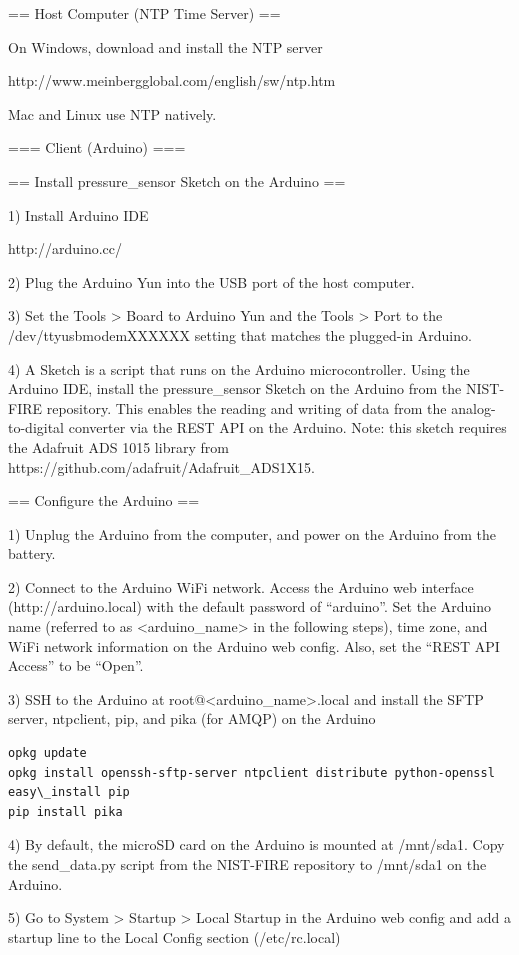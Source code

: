 \documentclass[11pt,oneside]{book}
\begin{document}
== Host Computer (NTP Time Server) ==

On Windows, download and install the NTP server

http://www.meinbergglobal.com/english/sw/ntp.htm

Mac and Linux use NTP natively.


=== Client (Arduino) ===

== Install pressure\_sensor Sketch on the Arduino ==

1) Install Arduino IDE

http://arduino.cc/

2) Plug the Arduino Yun into the USB port of the host computer.

3) Set the Tools > Board to Arduino Yun and the Tools > Port to the /dev/ttyusbmodemXXXXXX setting that matches the plugged-in Arduino.

4) A Sketch is a script that runs on the Arduino microcontroller. Using the Arduino IDE, install the pressure\_sensor Sketch on the Arduino from the NIST-FIRE repository. This enables the reading and writing of data from the analog-to-digital converter via the REST API on the Arduino. Note: this sketch requires the Adafruit ADS 1015 library from https://github.com/adafruit/Adafruit\_ADS1X15.

== Configure the Arduino ==

1) Unplug the Arduino from the computer, and power on the Arduino from the battery.

2) Connect to the Arduino WiFi network. Access the Arduino web interface (http://arduino.local) with the default password of “arduino”. Set the Arduino name (referred to as <arduino\_name> in the following steps), time zone, and WiFi network information on the Arduino web config. Also, set the “REST API Access” to be “Open”.

3) SSH to the Arduino at root@<arduino\_name>.local and install the SFTP server, ntpclient, pip, and pika (for AMQP) on the Arduino

\begin{verbatim}
opkg update
opkg install openssh-sftp-server ntpclient distribute python-openssl
easy\_install pip
pip install pika
\end{verbatim}

4) By default, the microSD card on the Arduino is mounted at /mnt/sda1. Copy the send\_data.py script from the NIST-FIRE repository to /mnt/sda1 on the Arduino.

5) Go to System > Startup > Local Startup in the Arduino web config and add a startup line to the Local Config section (/etc/rc.local)
\end{document}
